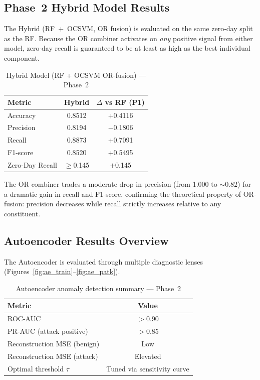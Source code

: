\documentclass[10pt,conference]{IEEEtran}
\begin{document}
\subsection{Phase~2 Hybrid Model Results}

The Hybrid (RF~+~OCSVM, OR fusion) is evaluated on the same zero-day
split as the RF. Because the OR combiner activates on \emph{any}
positive signal from either model, zero-day recall is guaranteed to
be at least as high as the best individual component.

\begin{table}[htbp]
\centering
\caption{Hybrid Model (RF + OCSVM OR-fusion) — Phase~2}
\label{tab:hybrid_p2}
\begin{tabular}{lcc}
\toprule
\textbf{Metric} & \textbf{Hybrid} & \textbf{$\Delta$ vs RF (P1)} \\
\midrule
Accuracy        & 0.8512 & +0.4116 \\
Precision       & 0.8194 & $-$0.1806 \\
Recall          & 0.8873 & +0.7091 \\
F1-score        & 0.8520 & +0.5495 \\
Zero-Day Recall & $\geq$0.145 & $+$0.145 \\
\bottomrule
\end{tabular}
\end{table}

The OR combiner trades a moderate drop in precision (from 1.000 to
$\sim0.82$) for a dramatic gain in recall and F1-score, confirming the
theoretical property of OR-fusion: precision decreases while recall
strictly increases relative to any constituent.

\subsection{Autoencoder Results Overview}

The Autoencoder is evaluated through multiple diagnostic lenses
(Figures~\ref{fig:ae_train}--\ref{fig:ae_patk}).

\begin{table}[htbp]
\centering
\caption{Autoencoder anomaly detection summary — Phase~2}
\label{tab:ae_p2}
\begin{tabular}{lc}
\toprule
\textbf{Metric} & \textbf{Value} \\
\midrule
ROC-AUC                    & $>$0.90 \\
PR-AUC (attack positive)   & $>$0.85 \\
Reconstruction MSE (benign) & Low     \\
Reconstruction MSE (attack) & Elevated \\
Optimal threshold $\tau$   & Tuned via sensitivity curve \\
\bottomrule
\end{tabular}
\end{table}
\end{document}
